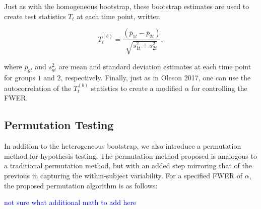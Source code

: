 \documentclass{article}
\providecommand{\cn}[1]{\textcolor{blue}{#1}}
\begin{document}
Just as with the homogeneous bootstrap, these bootstrap estimates are used to create test statistics $T_t$ at each time point, written

\begin{equation}
T_t^{(b)} = \frac{(\overline{p}_{1t} - \overline{p}_{2t})}{\sqrt{s_{1t}^2 + s_{2t}^2}},
\end{equation}

where $\overline{p}_{gt}$ and $s_{gt}^2$ are mean and standard deviation estimates at each time point for groups $1$ and $2$, respectively. Finally, just as in Oleson 2017, one can use the autocorrelation of the $T_t^{(b)}$ statistics to create a modified $\alpha$ for controlling the FWER.



\subsection{Permutation Testing}

In addition to the heterogeneous bootstrap, we also introduce a permutation method for hypothesis testing. The permutation method proposed is analogous to a traditional permutation method, but with an added step mirroring that of the previous in capturing the within-subject variability. For a specified FWER of $\alpha$, the proposed permutation algorithm is as follows:

\cn{not sure what additional math to add here}
\end{document}
